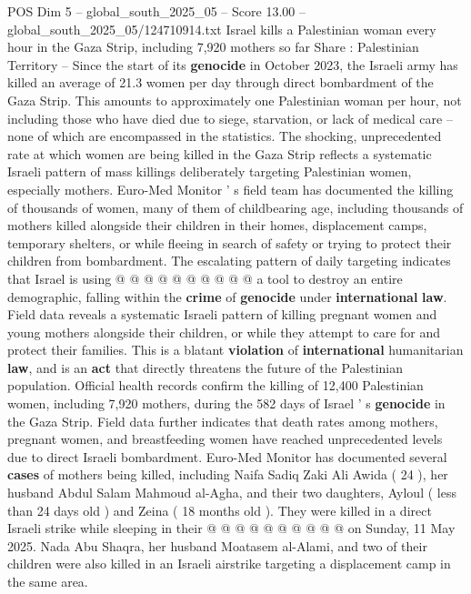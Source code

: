 \begin{textsample}{POS Dim 5 – global\_south\_2025\_05 – Score 13.00 – global\_south\_2025\_05/124710914.txt}  \label{ex:f5_pos_199}
Israel kills a Palestinian woman every hour in the Gaza Strip, including 7,920 mothers so far Share : Palestinian Territory -- Since the start of its \textbf{genocide} in October 2023, the Israeli army has killed an average of 21.3 women per day through direct bombardment of the Gaza Strip.
This amounts to approximately one Palestinian woman per hour, not including those who have died due to siege, starvation, or lack of medical care -- none of which are encompassed in the statistics.
The shocking, unprecedented rate at which women are being killed in the Gaza Strip reflects a systematic Israeli pattern of mass killings deliberately targeting Palestinian women, especially mothers.
Euro-Med Monitor ' s field team has documented the killing of thousands of women, many of them of childbearing age, including thousands of mothers killed alongside their children in their homes, displacement camps, temporary shelters, or while fleeing in search of safety or trying to protect their children from bombardment.
The escalating pattern of daily targeting indicates that Israel is using @ @ @ @ @ @ @ @ @ @ a tool to destroy an entire demographic, falling within the \textbf{crime} of \textbf{genocide} under \textbf{international} \textbf{law}.
Field data reveals a systematic Israeli pattern of killing pregnant women and young mothers alongside their children, or while they attempt to care for and protect their families.
This is a blatant \textbf{violation} of \textbf{international} humanitarian \textbf{law}, and is an \textbf{act} that directly threatens the future of the Palestinian population.
Official health records confirm the killing of 12,400 Palestinian women, including 7,920 mothers, during the 582 days of Israel ' s \textbf{genocide} in the Gaza Strip.
Field data further indicates that death rates among mothers, pregnant women, and breastfeeding women have reached unprecedented levels due to direct Israeli bombardment.
Euro-Med Monitor has documented several \textbf{cases} of mothers being killed, including Naifa Sadiq Zaki Ali Awida ( 24 ), her husband Abdul Salam Mahmoud al-Agha, and their two daughters, Ayloul ( less than 24 days old ) and Zeina ( 18 months old ).
They were killed in a direct Israeli strike while sleeping in their @ @ @ @ @ @ @ @ @ @ on Sunday, 11 May 2025.
Nada Abu Shaqra, her husband Moatasem al-Alami, and two of their children were also killed in an Israeli airstrike targeting a displacement camp in the same area.

\end{textsample}
